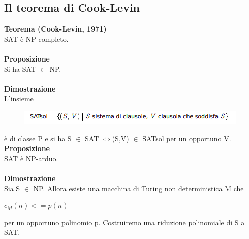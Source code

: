 \subsection{Il teorema di Cook-Levin}
\textbf{Teorema (Cook-Levin, 1971)}\\
SAT è NP-completo.\\\\
\textbf{Proposizione}\\
Si ha SAT $\in$ NP.\\\\
\textbf{Dimostrazione}\\
L’insieme
\begin{figure}[htp]
    \centering
    \includegraphics[scale=0.9]{tesi_stile/img/foto3cap12.png}
\end{figure}
è di classe P e si ha S $\in$ SAT $\Longleftrightarrow$(S,V) $\in$ SATsol per un opportuno V.
\newpage
\textbf{Proposizione}\\
SAT è NP-arduo.\\\\
\textbf{Dimostrazione}\\
Sia S $\in$ NP. Allora esiste una macchina di Turing non deterministica M che
\begin{center}
    $c_M(n) <= p(n)$
\end{center}
per un opportuno polinomio p.
Costruiremo una riduzione polinomiale di S a SAT.
\newpage
